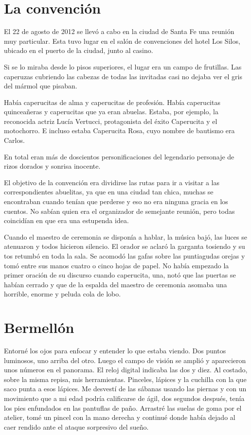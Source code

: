 \documentclass[11pt,twoside,openright,a6paper]{book}
\begin{document}
\chapter*{La convención}

El 22 de agosto de 2012 se llevó a cabo en la ciudad de Santa Fe una reunión muy particular. Esta tuvo lugar en el salón de convenciones del hotel Los Silos, ubicado en el puerto de la ciudad, junto al casino.

Si se lo miraba desde lo pisos superiores, el lugar era un campo de frutillas. Las caperuzas cubriendo las cabezas de todas las invitadas casi no dejaba ver el gris del mármol que pisaban.

Había caperucitas de alma y caperucitas de profesión. Había caperucitas quinceañeras y caperucitas que ya eran abuelas.
Estaba, por ejemplo, la reconocida actriz Lucía Vertucci, protagonista del éxito Caperucita y el motochorro. E incluso estaba Caperucita Rosa, cuyo nombre de bautismo era Carlos.

En total eran más de doscientos personificaciones del legendario personaje de rizos dorados y sonrisa inocente.

El objetivo de la convención era dividirse las rutas para ir a visitar a las correspondientes abuelitas, ya que en una ciudad tan chica, muchas se encontraban cuando tenían que perderse y eso no era ninguna gracia en los cuentos. No sabían quien era el organizador de semejante reunión, pero todas coincidían en que era una estupenda idea.

Cuando el maestro de ceremonia se disponía a hablar, la música bajó, las luces se atenuaron y todos hicieron silencio. El orador se aclaró la garganta tosiendo y su tos retumbó en toda la sala. Se acomodó las gafas sobre las puntiagudas orejas y tomó entre sus manos cuatro o cinco hojas de papel. No había empezado la primer oración de su discurso cuando caperucita, una, notó que las puertas se habían cerrado y que de la espalda del maestro de ceremonia asomaba una horrible, enorme y peluda cola de lobo.

\chapter*{Bermellón}

Entorné los ojos para enfocar y entender lo que estaba viendo. Dos puntos luminosos, uno arriba del otro. Luego el campo de visión se amplió y aparecieron unos números en el panorama. El reloj digital indicaba las dos y diez. Al costado, sobre la misma repisa, mis herramientas. Pinceles, lápices y la cuchilla con la que saco punta a esos lápices. Me desvestí de las sábanas usando las piernas y con un movimiento que a mi edad podría calificarse de ágil, dos segundos después, tenía los pies enfundados en las pantuflas de paño. Arrastré las suelas de goma por el atelier, tomé un pincel con la mano derecha y continué donde había dejado al caer rendido ante el ataque sorpresivo del sueño.
\end{document}
